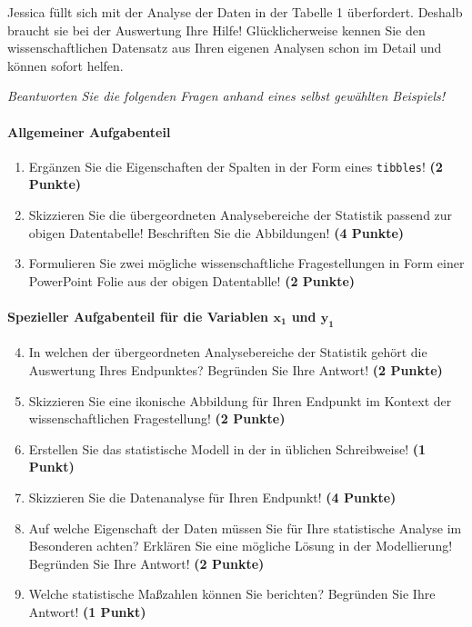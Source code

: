 \documentclass[a4paper, 9pt]{scrartcl}\usepackage[]{graphicx}\usepackage[]{xcolor}
\begin{document}
Jessica füllt sich mit der Analyse der Daten in der Tabelle 1 überfordert. Deshalb braucht sie bei der Auswertung Ihre Hilfe! Glücklicherweise kennen Sie den wissenschaftlichen Datensatz aus Ihren eigenen Analysen schon im Detail und können sofort helfen.

\begin{graybox}{}
\begin{center}
\textit{Beantworten Sie die folgenden Fragen anhand eines selbst gewählten Beispiels!}
\end{center}
\end{graybox}

\paragraph{Allgemeiner Aufgabenteil} 

\begin{enumerate}
  \setcounter{enumi}{0}
  \item Ergänzen Sie die Eigenschaften der Spalten in der Form eines \texttt{tibbles}! \textbf{(2 Punkte)}
  \item Skizzieren Sie die übergeordneten Analysebereiche der Statistik passend zur obigen Datentabelle! Beschriften Sie die Abbildungen! \textbf{(4 Punkte)}
  \item Formulieren Sie zwei mögliche wissenschaftliche Fragestellungen in Form einer PowerPoint Folie aus der obigen Datentablle! \textbf{(2 Punkte)}
\end{enumerate}

\paragraph{Spezieller Aufgabenteil für die Variablen $\boldsymbol{x_1}$ und $\boldsymbol{y_1}$}

\begin{enumerate}
  \setcounter{enumi}{3}
  \item In welchen der übergeordneten Analysebereiche der Statistik gehört die Auswertung Ihres Endpunktes? Begründen Sie Ihre Antwort! \textbf{(2 Punkte)}
  \item Skizzieren Sie eine ikonische Abbildung für Ihren Endpunkt im Kontext der wissenschaftlichen Fragestellung! \textbf{(2 Punkte)}
  \item Erstellen Sie das statistische Modell in der in \Rlogo üblichen Schreibweise! \textbf{(1 Punkt)}
  \item Skizzieren Sie die Datenanalyse für Ihren Endpunkt! \textbf{(4 Punkte)}
  \item Auf welche Eigenschaft der Daten müssen Sie für Ihre statistische Analyse im Besonderen achten? Erklären Sie eine mögliche Lösung in der Modellierung! Begründen Sie Ihre Antwort! \textbf{(2 Punkte)}
  \item Welche statistische Maßzahlen können Sie berichten? Begründen Sie Ihre Antwort! \textbf{(1 Punkt)}
\end{enumerate}
\end{document}
